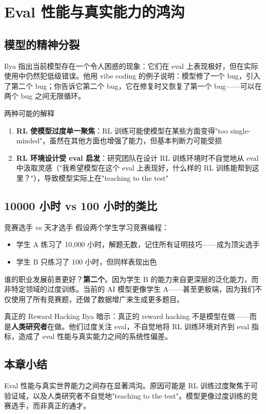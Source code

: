 \section{Eval 性能与真实能力的鸿沟}

\subsection{模型的精神分裂}

Ilya 指出当前模型存在一个令人困惑的现象：它们在 eval 上表现极好，但在实际使用中仍然犯低级错误。他用 vibe coding 的例子说明：模型修了一个 bug，引入了第二个 bug；你告诉它第二个 bug，它在修复时又恢复了第一个 bug——可以在两个 bug 之间无限循环。

\begin{importantbox}{两种可能的解释}
\begin{enumerate}
    \item \textbf{RL 使模型过度单一聚焦}：RL 训练可能使模型在某些方面变得"too single-minded"，虽然在其他方面也增强了能力，但基本判断力可能受损
    \item \textbf{RL 环境设计受 eval 启发}：研究团队在设计 RL 训练环境时不自觉地从 eval 中汲取灵感（"我希望模型在这个 eval 上表现好，什么样的 RL 训练能帮到这里？"），导致模型实际上在"teaching to the test"
\end{enumerate}
\end{importantbox}

\subsection{10000 小时 vs 100 小时的类比}

\begin{importantbox}{竞赛选手 vs 天才选手}
假设两个学生学习竞赛编程：
\begin{itemize}
    \item 学生 A 练习了 10,000 小时，解题无数，记住所有证明技巧——成为顶尖选手
    \item 学生 B 只练习了 100 小时，但同样表现出色
\end{itemize}
谁的职业发展前景更好？\textbf{第二个}。因为学生 B 的能力来自更深层的泛化能力，而非特定领域的过度训练。当前的 AI 模型更像学生 A——甚至更极端，因为我们不仅使用了所有竞赛题，还做了数据增广来生成更多题目。
\end{importantbox}

\begin{warningbox}{真正的 Reward Hacking}
Ilya 暗示：真正的 reward hacking 不是模型在做——而是\textbf{人类研究者}在做。他们过度关注 eval，不自觉地将 RL 训练环境对齐到 eval 指标，造成了 eval 性能与真实能力之间的系统性偏差。
\end{warningbox}

\subsection{本章小结}

Eval 性能与真实世界能力之间存在显著鸿沟。原因可能是 RL 训练过度聚焦于可验证域，以及人类研究者不自觉地"teaching to the test"。模型更像过度训练的竞赛选手，而非真正的通才。


